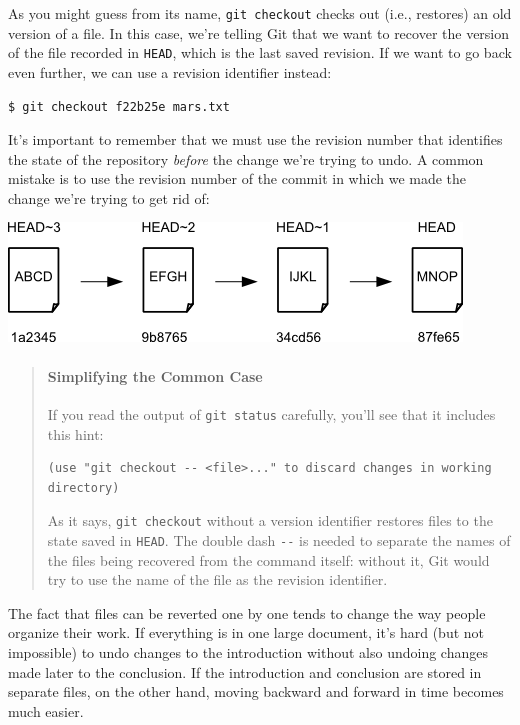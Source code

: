 \documentclass[]{book}
\begin{document}
As you might guess from its name, \texttt{git checkout} checks out
(i.e., restores) an old version of a file. In this case, we're telling
Git that we want to recover the version of the file recorded in
\texttt{HEAD}, which is the last saved revision. If we want to go back
even further, we can use a revision identifier instead:

\begin{verbatim}
$ git checkout f22b25e mars.txt
\end{verbatim}

It's important to remember that we must use the revision number that
identifies the state of the repository \emph{before} the change we're
trying to undo. A common mistake is to use the revision number of the
commit in which we made the change we're trying to get rid of:

\includegraphics{novice/git/img/git-when-revisions-updated.png}

\begin{quote}
\mbox{}\paragraph{Simplifying the Common Case}

If you read the output of \texttt{git status} carefully, you'll see that
it includes this hint:

\begin{verbatim}
(use "git checkout -- <file>..." to discard changes in working directory)
\end{verbatim}

As it says, \texttt{git checkout} without a version identifier restores
files to the state saved in \texttt{HEAD}. The double dash \texttt{-{}-}
is needed to separate the names of the files being recovered from the
command itself: without it, Git would try to use the name of the file as
the revision identifier.
\end{quote}

The fact that files can be reverted one by one tends to change the way
people organize their work. If everything is in one large document, it's
hard (but not impossible) to undo changes to the introduction without
also undoing changes made later to the conclusion. If the introduction
and conclusion are stored in separate files, on the other hand, moving
backward and forward in time becomes much easier.
\end{document}
